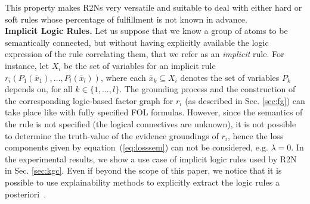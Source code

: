 \documentclass[journal]{IEEEtran}
\begin{document}
{This property makes R2Ns very versatile and suitable to deal with either hard or soft rules whose percentage of fulfillment is not known in advance.
\\
{\bf Implicit Logic Rules. } Let us suppose that we know a group of atoms to be semantically connected, but without having explicitly available the logic expression of the rule correlating them, that we refer as an \textit{implicit} rule. 
For instance, let $X_i$ be the set of variables for an implicit rule $r_i(P_1(\bar{x}_1),\ldots,P_l(\bar{x}_l))$, where each $\bar{x}_k\subseteq X_i$ denotes the set of variables $P_k$ depends on, for all $k\in\{1,\ldots,l\}$.
The grounding process and the construction of the corresponding logic-based factor graph for $r_i$ (as described in Sec. \ref{sec:fg}) can take place like with fully specified FOL formulas. However, since the semantics of the rule is not specified (the logical connectives are unknown), it is not possible to determine the truth-value of the evidence groundings of $r_i$, hence the loss components given by equation~(\ref{eq:losssem}) can not be considered, e.g. $\lambda=0$. In the experimental results, we show a use case of implicit logic rules used by R2N in Sec. \ref{sec:kgc}. Even if beyond the scope of this paper, we notice that it is possible to use explainability methods to explicitly extract the logic rules a posteriori~\cite{ciravegna2020human}.}


\end{document}
